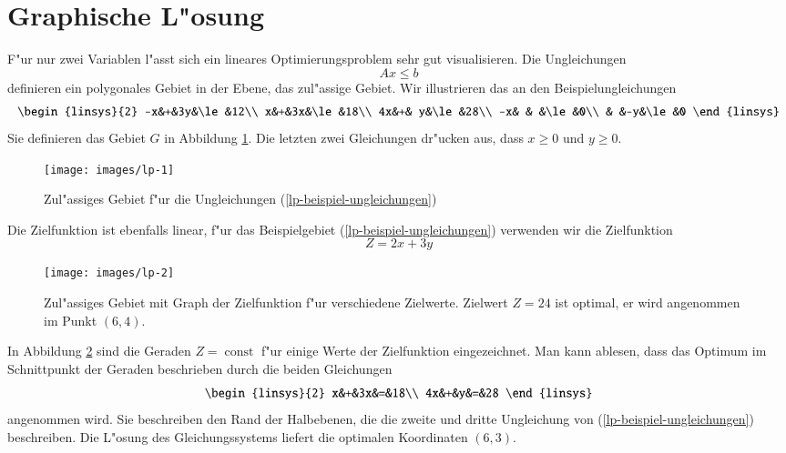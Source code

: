 \section{Graphische L"osung\label{lp:section:graphisch}}
F"ur nur zwei Variablen l"asst sich ein lineares Optimierungsproblem
sehr gut visualisieren. Die Ungleichungen
\[
Ax\le b
\]
definieren ein polygonales Gebiet in der Ebene, das zul"assige Gebiet.
Wir illustrieren das an den Beispielungleichungen
\begin{equation}
\begin{linsys}{2}
-x&+&3y&\le&12\\
 x&+&3x&\le&18\\
4x&+& y&\le&28\\
-x& &  &\le&0\\
  & &-y&\le&0
\end{linsys}
\label{lp-beispiel-ungleichungen}
\end{equation}
Sie definieren das Gebiet $G$ in Abbildung \ref{lp-beispiel}.
Die letzten zwei Gleichungen dr"ucken aus, dass $x\ge 0$ und $y\ge 0$.
\begin{figure}
\begin{center}
\texttt{[image: images/lp-1]}
\end{center}
\caption{Zul"assiges Gebiet f"ur die Ungleichungen
(\ref{lp-beispiel-ungleichungen})\label{lp-beispiel}}
\end{figure}

Die Zielfunktion ist ebenfalls linear, f"ur das Beispielgebiet
(\ref{lp-beispiel-ungleichungen}) verwenden wir die Zielfunktion
\begin{equation}
Z=2x+3y
\label{lp-beispiel-zielfunktion}
\end{equation}
\begin{figure}
\begin{center}
\texttt{[image: images/lp-2]}
\end{center}
\caption{Zul"assiges Gebiet mit Graph der Zielfunktion f"ur verschiedene
Zielwerte. Zielwert $Z=24$ ist optimal, er wird angenommen im
Punkt $(6,4)$.
\label{lp-beispiel-zielfunktion}}
\end{figure}%
In Abbildung \ref{lp-beispiel-zielfunktion} sind die Geraden $Z=\operatorname{const}$
f"ur einige Werte der Zielfunktion eingezeichnet.
Man kann ablesen, dass das Optimum im Schnittpunkt der Geraden
beschrieben durch die beiden Gleichungen
\begin{equation}
\begin{linsys}{2}
x&+&3x&=&18\\
4x&+&y&=&28
\end{linsys}
\notag
\end{equation}
angenommen wird. Sie beschreiben den Rand der Halbebenen, die die
zweite und dritte Ungleichung von (\ref{lp-beispiel-ungleichungen}) 
beschreiben.
Die L"osung des Gleichungssystems liefert die optimalen Koordinaten
$(6,3)$.

